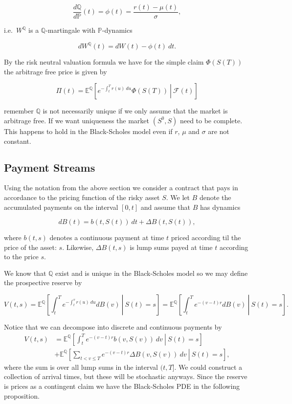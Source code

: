\documentclass[a4paper,12pt,openany]{book}
\begin{document}
\[
\frac{d\mathbb Q}{d\mathbb P}(t)=\phi(t)=\frac{r(t)-\mu(t)}{\sigma},
\]

i.e.~\(W^{\mathbb Q}\) is a \(\mathbb Q\)-martingale with \(\mathbb P\)-dynamics

\[
dW^{\mathbb Q}(t)=dW(t)-\phi(t)\ dt.
\]

By the risk neutral valuation formula we have for the simple claim \(\Phi(S(T))\) the arbitrage free price is given by

\[
\Pi(t)=\mathbb E^{\mathbb Q}\left[\left.e^{-\int_t^Tr(u)\ du}\Phi(S(T))\ \right\vert\ \mathcal F(t)\right]
\]

remember \(\mathbb Q\) is not necessarily unique if we only assume that the market is arbitrage free. If we want uniqueness the market \((S^0,S)\) need to be complete. This happens to hold in the Black-Scholes model even if \(r\), \(\mu\) and \(\sigma\) are not constant.

\hypertarget{payment-streams}{%
\subsection{Payment Streams}\label{payment-streams}}

Using the notation from the above section we consider a contract that pays in accordance to the pricing function of the risky asset \(S\). We let \(B\) denote the accumulated payments on the interval \([0,t]\) and assume that \(B\) has dynamics

\[
dB(t)=b(t,S(t))\ dt+\Delta B(t,S(t)),
\]

where \(b(t,s)\) denotes a continuous payment at time \(t\) priced according til the price of the asset: \(s\). Likewise, \(\Delta B(t,s)\) is lump sums payed at time \(t\) according to the price \(s\).

We know that \(\mathbb Q\) exist and is unique in the Black-Scholes model so we may define the prospective reserve by

\[
V(t,s)=\mathbb E^{\mathbb Q}\left[\left.\int_t^Te^{-\int_t^vr(u)\ du}dB(v)\ \right\vert\ S(t)=s\right]=\mathbb E^{\mathbb Q}\left[\left.\int_t^Te^{-(v-t)r}dB(v)\ \right\vert\ S(t)=s\right].
\]

Notice that we can decompose into discrete and continuous payments by
\begin{align*}
V(t,s)&=\mathbb E^{\mathbb Q}\left[\left.\int_t^Te^{-(v-t)r}b(v,S(v))\ dv\ \right\vert\ S(t)=s\right]\\
&+\mathbb E^{\mathbb Q}\left[\left.\sum_{t< v\le T}e^{-(v-t)r}\Delta B(v,S(v))\ dv\ \right\vert\ S(t)=s\right],
\end{align*}
where the sum is over all lump sums in the interval \((t,T]\). We could construct a collection of arrival times, but these will be stochastic anyways. Since the reserve is prices as a contingent claim we have the Black-Scholes PDE in the following proposition.
\end{document}
